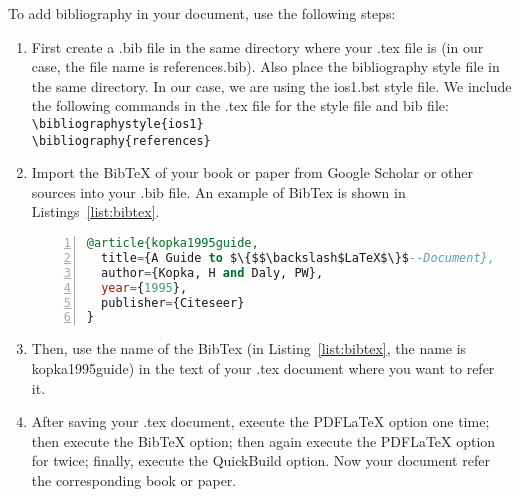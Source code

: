 To add bibliography in your document, use the following steps:
\begin{enumerate}
\item First create a .bib file in the same directory where your .tex file is (in our case, the file name is references.bib). Also place the bibliography style file in the same directory. In our case, we are using the ios1.bst style file. We include the following commands in the .tex file for the style file and bib file: \\
 \texttt{\textbackslash bibliographystyle\{ios1\}} \\
\texttt{\textbackslash bibliography\{references\}} 
\item Import the BibTeX of your book or paper from Google Scholar or other sources into your .bib file. An example of BibTex is shown in Listings~\ref{list:bibtex}.  

\begin{lstlisting}[caption={A BibTeX example}, label=list:bibtex, captionpos=b,
           backgroundcolor=\color{white},
           language=SQL,
           breaklines=true,
           frame=single,
           showspaces=false,
           basicstyle=\ttfamily,
           numbers=left,
           numberstyle=\tiny,
           rulecolor=\color{red},
           commentstyle=\color{gray}
        ]
@article{kopka1995guide,
  title={A Guide to $\{$$\backslash$LaTeX$\}$--Document},
  author={Kopka, H and Daly, PW},
  year={1995},
  publisher={Citeseer}
}
\end{lstlisting}

\item Then, use the name of the BibTex (in Listing~\ref{list:bibtex}, the name is kopka1995guide) in the text of your .tex document where you want to refer it.

\item After saving your .tex document, execute the PDFLaTeX option one time; then execute the BibTeX option; then again execute the PDFLaTeX option for twice; finally, execute the QuickBuild option. Now your document refer the corresponding book or paper. 
\end{enumerate}